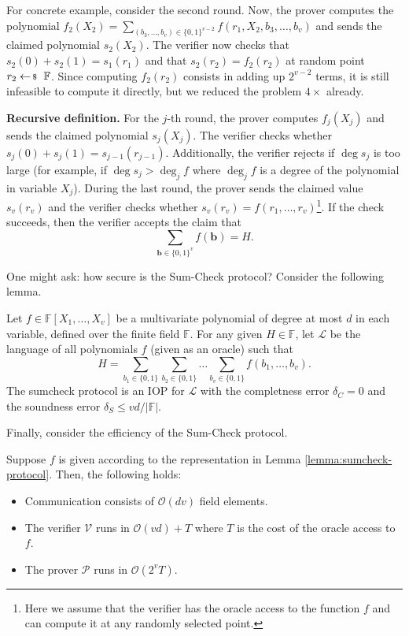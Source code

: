 \documentclass[../../book.tex]{subfiles}
\begin{document}
For concrete example, consider the second round. Now, the prover computes the
polynomial $f_2(X_2) = \sum_{(b_3,\dots,b_v) \in \{0,1\}^{v-2}}
f(r_1,X_2,b_3,\dots,b_v)$ and sends the claimed polynomial $s_2(X_2)$. The
verifier now checks that $s_2(0) + s_2(1) = s_1(r_1)$ and that $s_2(r_2) =
f_2(r_2)$ at random point $r_2 \leftarrowS \mathbb{F}$. Since computing
$f_2(r_2)$ consists in adding up $2^{v-2}$ terms, it is still infeasible to
compute it directly, but we reduced the problem $4 \times$ already.

\textbf{Recursive definition.} For the $j$-th round, the prover computes
$f_j(X_j)$ and sends the claimed polynomial $s_j(X_j)$. The verifier checks
whether $s_j(0) + s_j(1) = s_{j-1}(r_{j-1})$. Additionally, the verifier rejects
if $\deg s_j$ is too large (for example, if $\deg s_j > \deg_j f$ where $\deg_j
f$ is a degree of the polynomial in variable $X_j$). During the last round, the
prover sends the claimed value $s_v(r_v)$ and the verifier checks whether
$s_v(r_v) = f(r_1,\dots,r_v)$\footnote{Here we assume that the verifier has the
oracle access to the function $f$ and can compute it at any randomly selected
point.}. If the check succeeds, then the verifier accepts the claim that
\begin{equation*}
    \sum_{\boldsymbol{b} \in \{0,1\}^v} f(\boldsymbol{b}) = H.
\end{equation*}

One might ask: how secure is the Sum-Check protocol? Consider the following 
lemma.
\begin{lemma}\label{lemma:sumcheck-protocol}
    Let $f \in \mathbb{F}[X_1,\dots,X_v]$ be a multivariate polynomial of degree
    at most $d$ in each variable, defined over the finite field $\mathbb{F}$.
    For any given $H \in \mathbb{F}$, let $\mathcal{L}$ be the language of 
    all polynomials $f$ (given as an oracle) such that
    \begin{equation*}
        H = \sum_{b_1 \in \{0,1\}}\sum_{b_2 \in \{0,1\}} \dots \sum_{b_v \in \{0,1\}} f(b_1,\dots,b_v).
    \end{equation*}
    The sumcheck protocol is an IOP for $\mathcal{L}$ with the completness error
    $\delta_C=0$ and the soundness error $\delta_S \leq vd/|\mathbb{F}|$.
\end{lemma}

Finally, consider the efficiency of the Sum-Check protocol.
\begin{lemma}
    Suppose $f$ is given according to the representation in Lemma \ref{lemma:sumcheck-protocol}. Then, the 
    following holds:
    \begin{itemize}
        \item Communication consists of $\mathcal{O}(dv)$ field elements.
        \item The verifier $\mathcal{V}$ runs in $\mathcal{O}(vd)+T$ where $T$
        is the cost of the oracle access to $f$.
        \item The prover $\mathcal{P}$ runs in $\mathcal{O}(2^vT)$.
    \end{itemize}
\end{lemma}
\end{document}
